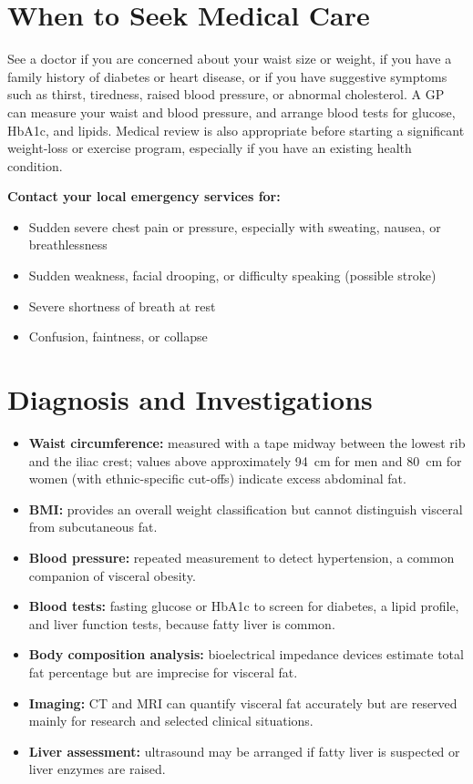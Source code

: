 \section*{When to Seek Medical Care}
See a doctor if you are concerned about your waist size or weight, if you have a family history of diabetes or heart disease, or if you have suggestive symptoms such as thirst, tiredness, raised blood pressure, or abnormal cholesterol. A GP can measure your waist and blood pressure, and arrange blood tests for glucose, HbA1c, and lipids. Medical review is also appropriate before starting a significant weight-loss or exercise program, especially if you have an existing health condition.

\textbf{Contact your local emergency services for:}
\begin{itemize}
    \item Sudden severe chest pain or pressure, especially with sweating, nausea, or breathlessness
    \item Sudden weakness, facial drooping, or difficulty speaking (possible stroke)
    \item Severe shortness of breath at rest
    \item Confusion, faintness, or collapse
\end{itemize}

\section*{Diagnosis and Investigations}
\begin{itemize}
    \item \textbf{Waist circumference:} measured with a tape midway between the lowest rib and the iliac crest; values above approximately 94~cm for men and 80~cm for women (with ethnic-specific cut-offs) indicate excess abdominal fat.
    \item \textbf{BMI:} provides an overall weight classification but cannot distinguish visceral from subcutaneous fat.
    \item \textbf{Blood pressure:} repeated measurement to detect hypertension, a common companion of visceral obesity.
    \item \textbf{Blood tests:} fasting glucose or HbA1c to screen for diabetes, a lipid profile, and liver function tests, because fatty liver is common.
    \item \textbf{Body composition analysis:} bioelectrical impedance devices estimate total fat percentage but are imprecise for visceral fat.
    \item \textbf{Imaging:} CT and MRI can quantify visceral fat accurately but are reserved mainly for research and selected clinical situations.
    \item \textbf{Liver assessment:} ultrasound may be arranged if fatty liver is suspected or liver enzymes are raised.
\end{itemize}

